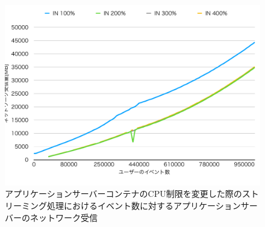 \documentclass[../../../../../main]{subfiles}
\begin{document}
    \begin{figure}[H]
        \centering
        \includegraphics[width=12cm]{graph}
        \caption{アプリケーションサーバーコンテナのCPU制限を変更した際のストリーミング処理におけるイベント数に対するアプリケーションサーバーのネットワーク受信}
        \label{fig:stream-change-app-cpu-limit-app-net-in-app_1024-db_1_1024}
    \end{figure}
\end{document}
